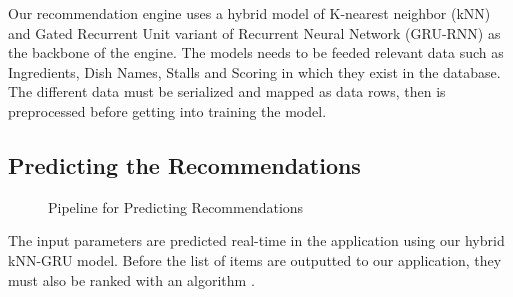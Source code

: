 Our recommendation engine uses a hybrid model of K-nearest neighbor (kNN)
and Gated Recurrent Unit variant of Recurrent Neural Network (GRU-RNN) as the backbone of the engine.
The models needs to be feeded relevant data such as Ingredients, Dish Names, Stalls and Scoring in which they exist in
the database. The different data must be serialized and mapped as data rows, then is preprocessed before getting into training the model. \cite{bansalandbaliyan:2023}

\subsection{Predicting the Recommendations}
\begin{figure}[h!]
    \centering
    
    \caption{Pipeline for Predicting Recommendations}
\end{figure}

The input parameters are predicted real-time in the application using our hybrid kNN-GRU model.
Before the list of items are outputted to our application, they must also be ranked with an algorithm \cite{bansalandbaliyan:2023}.